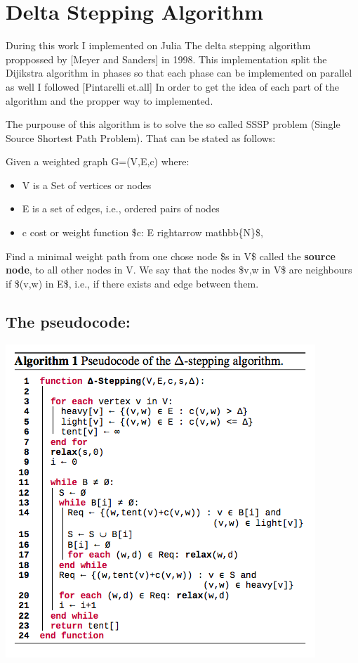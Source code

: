 \documentclass[letterpaper,10pt,english]{sphinxmanual}
\begin{document}
\chapter{Delta Stepping Algorithm}
\label{Algorithm:delta-stepping-algorithm}\label{Algorithm::doc}\label{Algorithm:algorithm}
During this work I implemented on Julia  The delta stepping algorithm proppossed by {[}Meyer and Sanders{]} in 1998. This implementation split the Dijikstra algorithm  in phases so that each phase can be implemented on parallel as well I followed {[}Pintarelli et.all{]} In order to get the idea of each part of the algorithm and the propper way to implemented.

The purpouse of this algorithm is to solve the so called SSSP problem (Single Source Shortest Path Problem). That can be stated as follows:

Given a weighted graph G=(V,E,c) where:
\begin{itemize}
\item {} 
V is a Set of vertices or nodes

\item {} 
E is a set of edges, i.e., ordered pairs of nodes

\item {} 
c cost or weight function \$c: E rightarrow mathbb\{N\}\$,

\end{itemize}

Find a minimal weight path from one chose node \$s in V\$ called the \textbf{source node}, to all other nodes in V. We say that the nodes \$v,w in V\$ are neighbours if \$(v,w) in E\$, i.e., if there exists and edge between them.


\section{The pseudocode:}
\label{Algorithm:the-pseudocode}
\includegraphics{algo_1.png}
\end{document}
